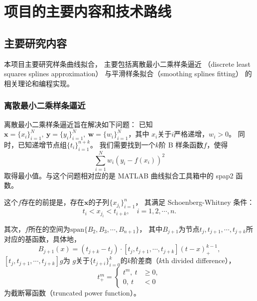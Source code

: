 \section{项目的主要内容和技术路线}

\subsection{主要研究内容}
本项目主要研究样条曲线拟合，
主要包括离散最小二乘样条逼近
（discrete least squares splines approximation）
与平滑样条拟合（smoothing splines fitting）
的相关理论和编程实现。
\subsubsection{离散最小二乘样条逼近}
离散最小二乘样条逼近旨在解决如下问题：
已知$\mathbf{x}=\{x_{i}\}_{i=1}^{N},\ \mathbf{y}=\{y_{i}\}_{i=1}^{N},
\ \mathbf{w}=\{w_{i}\}_{i=1}^{N}$，其中
$x_{i}$关于$i$严格递增，$w_{i}>0$。
同时，已知递增节点组$\{t_{i}\}_{i=1}^{n+k}$。
我们需要找到一个$k$阶 B 样条函数$f$，使得
\begin{equation}
  \label{eq:DiscreteLeastSquaresSplinesApproximation}
  \sum_{i=1}^{N}w_{i}(y_{i}-f(x_{i}))^{2}
\end{equation}
取得最小值。与这个问题相对应的是 MATLAB 曲线拟合工具箱中的 spap2 函数。

这个$f$存在的前提是，存在$\mathbf{x}$的子列$\{x_{j_{i}}\}_{i=1}^{n}$，
其满足 Schoenberg-Whitney 条件：
\begin{equation}
  \label{eq:SWcondition}
  t_{i}<x_{j_{i}}<t_{i+k},\quad i=1,2,\cdots,n.
\end{equation}

其次，$f$所在的空间为$\text{span}\{B_{2},B_{3},\cdots,B_{n+1}\}$，
其中$B_{j+1}$为节点$t_{j},t_{j+1},\cdots,t_{j+k}$所对应的基函数，具体地，
\begin{equation}
  \label{eq:basicBSpline}
  B_{j+1}(x)=
  (t_{j+k}-t_{j})\cdot [t_{j},t_{j+1},\cdots,t_{j+k}](t-x)_{+}^{k-1},
\end{equation}
$[t_{j},t_{j+1},\cdots,t_{j+k}]g$为
$g$关于$\{t_{j+i}\}_{i=0}^{k}$的$k$阶差商（$k$th divided difference），
\begin{equation}
  \label{eq:truncatedPowerFunc}
  t_{+}^{m}=
  \left\lbrace
    \begin{aligned}
      t^{m},\ t&\ge 0,\\
      0,\ t&<0
    \end{aligned}
  \right.
\end{equation}
为截断幂函数（truncated power function）。

